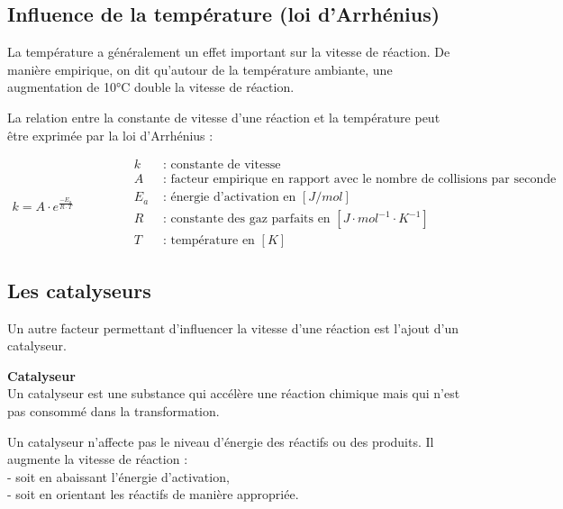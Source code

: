 \documentclass[
  11pt,
  a4paper,
  openany]{book}
\begin{document}
\newpage

\subsection{Influence de la température (loi d'Arrhénius)}\label{influence-de-la-tempuxe9rature-loi-darrhuxe9nius}

La température a généralement un effet important sur la vitesse de réaction. De manière empirique, on dit qu'autour de la température ambiante, une augmentation de 10°C double la vitesse de réaction.

La relation entre la constante de vitesse d'une réaction et la température peut être exprimée par la loi d'Arrhénius :

\[
\begin{split}
k = A \cdot e^{\frac{-E_a}{R \cdot T}}
\end{split}
\qquad\qquad
\begin{split}
k &\text{ : constante de vitesse} \\
A &\text{ : facteur empirique en rapport avec le nombre de collisions par seconde } \\
E_a &\text{ : énergie d'activation en } [J/mol] \\
R &\text{ : constante des gaz parfaits en } [J \cdot mol^{-1} \cdot K^{-1}] \\
T &\text{ : température en } [K]
\end{split}
\]

\subsection{Les catalyseurs}\label{les-catalyseurs-1}

Un autre facteur permettant d'influencer la vitesse d'une réaction est l'ajout d'un catalyseur.

\begin{tcolorbox}
\textbf{Catalyseur}\\
Un catalyseur est une substance qui accélère une réaction chimique mais qui n'est pas consommé dans la transformation.

\end{tcolorbox}

Un catalyseur n'affecte pas le niveau d'énergie des réactifs ou des produits. Il augmente la vitesse de réaction :\\
- soit en abaissant l'énergie d'activation,\\
- soit en orientant les réactifs de manière appropriée.
\end{document}
